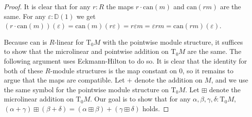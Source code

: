 \begin{proof}
  It is clear that for any $r : R$ the maps $r\cdot \mathrm{can}(m)$ and $\mathrm{can}(rm)$ are the same.
  For any $\varepsilon : \mathbb{D}(1)$ we get $(r\cdot\mathrm{can}(m))(\varepsilon) = \mathrm{can}(m)(r\varepsilon) = r\varepsilon m = \varepsilon rm = \mathrm{can}(rm)(\varepsilon)$.

  Because $\mathrm{can}$ is $R$-linear for $\mathrm{T}_0M$ with the pointwise module structure, it suffices to show that the microlinear and pointwise addition on $\mathrm{T}_0M$ are the same.
  The following argument uses Eckmann-Hilton to do so.
  It is clear that the identity for both of these $R$-module structures is the map constant on $0$, so it remains to argue that the maps are compatible.
  Let $+$ denote the addition on $M$, and we use the same symbol for the pointwise module structure on $\mathrm{T}_0M$.
  Let $\boxplus$ denote the microlinear addition on $\mathrm{T}_0M$.
  Our goal is to show that for any $\alpha, \beta, \gamma, \delta : \mathrm{T}_0M$, $(\alpha + \gamma) \boxplus (\beta + \delta) = (\alpha \boxplus \beta) + (\gamma \boxplus \delta)$ holds.


\end{proof}
